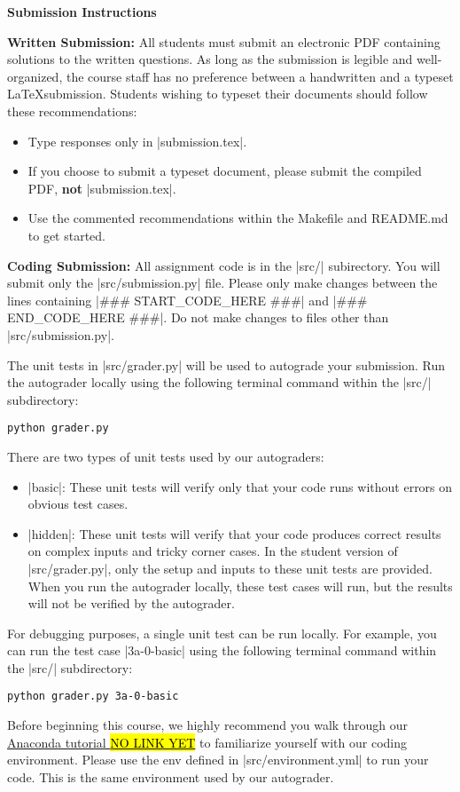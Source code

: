 {\bf Submission Instructions}

{\bf Written Submission:}
All students must submit an electronic PDF containing solutions to the written
questions. As long as the submission is legible and well-organized, the course
staff has no preference between a handwritten and a typeset \LaTeX submission.
Students wishing to typeset their documents should follow these recommendations:
\begin{itemize}
  \item Type responses only in |submission.tex|.
  \item If you choose to submit a typeset document, please submit the compiled
  PDF, {\bf not} |submission.tex|.
  \item Use the commented recommendations within the Makefile and README.md to
  get started.
\end{itemize}

{\bf Coding Submission:}
All assignment code is in the |src/| subirectory.  You will submit only the
|src/submission.py| file.  Please only make changes between the lines containing
|### START_CODE_HERE ###| and |### END_CODE_HERE ###|. Do not make changes to
files other than |src/submission.py|.

The unit tests in |src/grader.py| will be used to autograde your submission.
Run the autograder locally using the following terminal command within the
|src/| subdirectory:
\begin{lstlisting}
python grader.py
\end{lstlisting}

There are two types of unit tests used by our autograders:
\begin{itemize}
  \item |basic|:  These unit tests will verify only that your code runs without
  errors on obvious test cases.
  \item |hidden|: These unit tests will verify that your code produces correct
  results on complex inputs and tricky corner cases.  In the student version of
  |src/grader.py|, only the setup and inputs to these unit tests are provided.
  When you run the autograder locally, these test cases will run, but the
  results will not be verified by the autograder.
\end{itemize}

For debugging purposes, a single unit test can be run locally.  For example, you
can run the test case |3a-0-basic| using the following terminal command within
the |src/| subdirectory:
\begin{lstlisting}
python grader.py 3a-0-basic
\end{lstlisting}

Before beginning this course, we highly recommend you walk through our
\href{nolink}{Anaconda tutorial \hl{NO LINK YET}} to familiarize yourself with
our coding environment.  Please use the env defined in |src/environment.yml|
to run your code.  This is the same environment used by our autograder.
